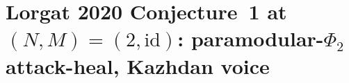 %

\providecommand{\ClaimStatusTheorem}{\textbf{[Thm]}}
\providecommand{\ClaimStatusConjectured}{\textbf{[Conj]}}
\providecommand{\ClaimStatusProvedElsewhere}{\textbf{[Proved elsewhere]}}
\providecommand{\kBKM}{\kappa_{\mathrm{BKM}}}
\providecommand{\kch}{\kappa_{\mathrm{ch}}}
\providecommand{\kcat}{\kappa_{\mathrm{cat}}}
\providecommand{\kfib}{\kappa_{\mathrm{fiber}}}
\providecommand{\phig}{\phi^{(g_2)}_{0,1}}
\providecommand{\Zg}{Z^{(g_2)}_{K3}}
\providecommand{\phio}{\phi_{0,1}}
\providecommand{\phiM}{\phi_{-2,1}}
\providecommand{\DTred}{Z^{\mathrm{red}}_{\mathrm{DT}}}
\providecommand{\PTred}{Z^{\mathrm{red}}_{\mathrm{PT}}}
\providecommand{\GWred}{Z^{\mathrm{red}}_{\mathrm{GW}}}
\providecommand{\Bo}{\mathrm{Bo}}
\providecommand{\Sp}{\operatorname{Sp}}
\providecommand{\SO}{\operatorname{SO}}
\providecommand{\Aut}{\operatorname{Aut}}
\providecommand{\wt}{\operatorname{wt}}
\providecommand{\Tr}{\operatorname{Tr}}
\providecommand{\HH}{\mathbb{H}}
\providecommand{\Z}{\mathbb{Z}}
\providecommand{\Q}{\mathbb{Q}}
\providecommand{\R}{\mathbb{R}}
\providecommand{\C}{\mathbb{C}}
\providecommand{\cO}{\mathcal{O}}
\providecommand{\cA}{\mathcal{A}}
\providecommand{\cM}{\mathcal{M}}
\providecommand{\cC}{\mathcal{C}}
\providecommand{\fg}{\mathfrak{g}}
\providecommand{\PhiFA}{\Phi^{\mathrm{FA}}}

\section{Lorgat 2020 Conjecture~1 at $(N,M)=(2,\mathrm{id})$:
paramodular-$\Phi_2$ attack-heal, Kazhdan voice}
\label{wn:sec:wave15-a2-lorgat-conj1-N2-kazhdan}

